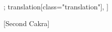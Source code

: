  \begin{alignment}[
    texts=edition[class="edition"];
    translation[class="translation"],
  ]
\begin{edition}
    \centerline{\textrm{\small{[Second Cakra]}}}
    \bigskip
    \begin{prose}

\end{prose}
\end{edition}
\end{alignment}

